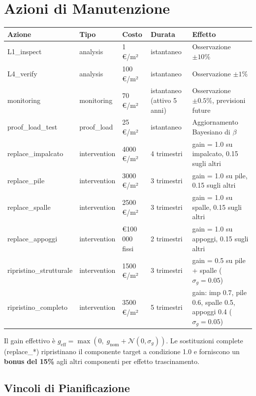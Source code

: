 \documentclass[11pt,a4paper]{article}
\begin{document}
\section{Azioni di Manutenzione}

\begin{longtable}{p{3.5cm}p{1.5cm}p{2.5cm}p{1.5cm}p{4cm}}
\toprule
\textbf{Azione} & \textbf{Tipo} & \textbf{Costo} & \textbf{Durata} & \textbf{Effetto} \\
\midrule
\endhead
L1\_inspect & analysis & 1 €/m² & istantaneo & Osservazione $\pm10\%$ \\
L4\_verify & analysis & 100 €/m² & istantaneo & Osservazione $\pm1\%$ \\
monitoring & monitoring & 70 €/m² & istantaneo (attivo 5 anni) & Osservazione $\pm0.5\%$, previsioni future \\
proof\_load\_test & proof\_load & 25 €/m² & istantaneo & Aggiornamento Bayesiano di $\beta$ \\
replace\_impalcato & intervention & 4000 €/m² & 4 trimestri & gain = 1.0 su impalcato, 0.15 sugli altri \\
replace\_pile & intervention & 3000 €/m² & 3 trimestri & gain = 1.0 su pile, 0.15 sugli altri \\
replace\_spalle & intervention & 2500 €/m² & 3 trimestri & gain = 1.0 su spalle, 0.15 sugli altri \\
replace\_appoggi & intervention & €100\,000 fissi & 2 trimestri & gain = 1.0 su appoggi, 0.15 sugli altri \\
ripristino\_strutturale & intervention & 1500 €/m² & 3 trimestri & gain = 0.5 su pile + spalle ($\sigma_g = 0.05$) \\
ripristino\_completo & intervention & 3500 €/m² & 5 trimestri & gain: imp 0.7, pile 0.6, spalle 0.5, appoggi 0.4 ($\sigma_g = 0.05$) \\
\bottomrule
\end{longtable}

Il gain effettivo \`e $g_{\text{eff}} = \max(0,\; g_{\text{nom}} + \mathcal{N}(0, \sigma_g))$. Le sostituzioni complete (replace\_*) ripristinano il componente target a condizione 1.0 e forniscono un \textbf{bonus del 15\%} agli altri componenti per effetto trascinamento.

\subsection{Vincoli di Pianificazione}
\end{document}
